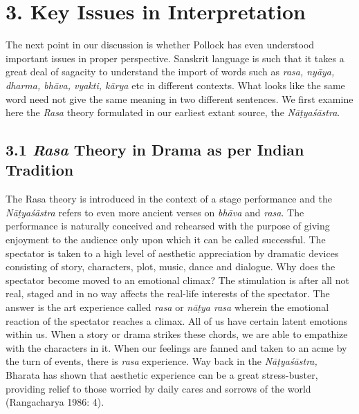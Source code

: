 \vspace{-.3cm}

\section*{3. Key Issues in Interpretation}

The next point in our discussion is whether Pollock has even understood important issues in proper perspective. Sanskrit language is such that it takes a great deal of sagacity to understand the import of words such as \textit{rasa, nyāya, dharma, bhāva, vyakti, kārya} etc in different contexts. What looks like the same word need not give the same meaning in two different sentences. We first examine here the \textit{Rasa} theory formulated in our earliest extant source, the \textit{Nāṭyaśāstra}.

\vspace{-.3cm}

\subsection*{3.1 \textit{Rasa} Theory in Drama as per Indian Tradition}

\vspace{-.3cm}

The Rasa theory is introduced in the context of a stage performance and the \textit{Nāṭyaśāstra }refers to even more ancient verses on \textit{bhāva} and \textit{rasa}. The performance is naturally conceived and rehearsed with the purpose of giving enjoyment to the audience only upon which it can be called successful. The spectator is taken to a high level of aesthetic appreciation by dramatic devices consisting of story, characters, plot, music, dance and dialogue. Why does the spectator become moved to an emotional climax? The stimulation is after all not real, staged and in no way affects the real-life interests of the spectator. The answer is the art experience called \textit{rasa} or \textit{nāṭya rasa} wherein the emotional reaction of the spectator reaches a climax. All of us have certain latent emotions within us. When a story or drama strikes these chords, we are able to empathize with the characters in it. When our feelings are fanned and taken to an acme by the turn of events, there is \textit{rasa} experience. Way back in the \textit{Nāṭyaśāstra,} Bharata has shown that aesthetic experience can be a great stress-buster, providing relief to those worried by daily cares and sorrows of the world (Rangacharya 1986: 4).

